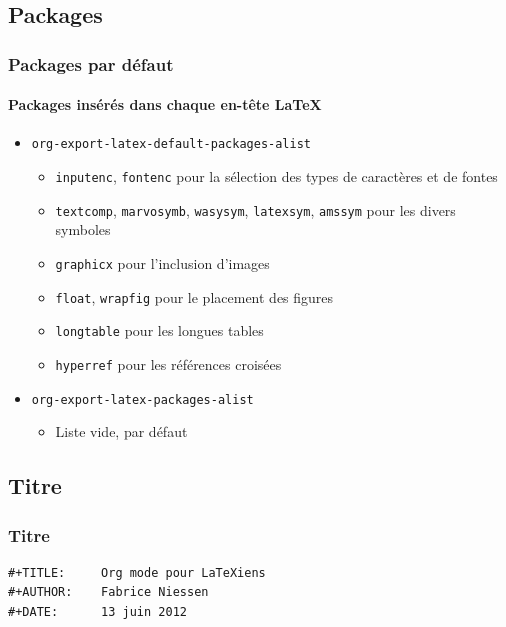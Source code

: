 \documentclass[presentation,t,hideothersubsections]{beamer}
\begin{document}
\subsection{Packages}
\label{sec-2-2}
\begin{frame}
\frametitle{Packages par défaut}
\framesubtitle{Packages insérés dans chaque en-tête \LaTeX{}}
\label{sec-2-2-1}


\begin{itemize}
\item \texttt{org-export-latex-default-packages-alist}
\begin{itemize}
\item \texttt{inputenc}, \texttt{fontenc} pour la sélection des types de caractères et de fontes
\item \texttt{textcomp}, \texttt{marvosymb}, \texttt{wasysym}, \texttt{latexsym}, \texttt{amssym} pour les divers symboles
\item \texttt{graphicx} pour l'inclusion d'images
\item \texttt{float}, \texttt{wrapfig} pour le placement des figures
\item \texttt{longtable} pour les longues tables
\item \texttt{hyperref} pour les références croisées
\end{itemize}
\item \texttt{org-export-latex-packages-alist}
\begin{itemize}
\item Liste vide, par défaut
\end{itemize}
\end{itemize}
\end{frame}
\subsection{Titre}
\label{sec-2-3}
\begin{frame}[fragile]
\frametitle{Titre}
\label{sec-2-3-1}



\lstset{language=org}
\begin{lstlisting}
#+TITLE:     Org mode pour LaTeXiens
#+AUTHOR:    Fabrice Niessen
#+DATE:      13 juin 2012
\end{lstlisting}
\end{frame}
\end{document}
